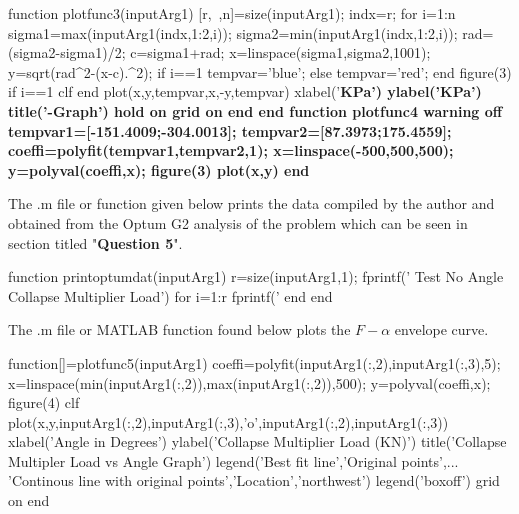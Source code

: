 \documentclass{article}
\begin{document}
\begin{matlabcode}
function plotfunc3(inputArg1)
[r,~,n]=size(inputArg1);
indx=r;
for i=1:n
    sigma1=max(inputArg1(indx,1:2,i));
    sigma2=min(inputArg1(indx,1:2,i));
    rad=(sigma2-sigma1)/2;
    c=sigma1+rad;
    x=linspace(sigma1,sigma2,1001);
    y=sqrt(rad^2-(x-c).^2);
    if i==1
        tempvar='blue';
    else
        tempvar='red';
    end
    figure(3)
    if i==1
        clf
    end
    plot(x,y,tempvar,x,-y,tempvar)
    xlabel('\bf\sigma KPa')
    ylabel('\bf\tau KPa')
    title('\tau-\sigma Graph')
    hold on
    grid on
end
end
function plotfunc4
warning off
tempvar1=[-151.4009;-304.0013];
tempvar2=[87.3973;175.4559];
coeffi=polyfit(tempvar1,tempvar2,1);
x=linspace(-500,500,500);
y=polyval(coeffi,x);
figure(3)
plot(x,y)
end
\end{matlabcode}

\begin{par}
\begin{flushleft}
The .m file or function given below prints the data compiled by the author and obtained from the Optum G2 analysis of the problem which can be seen in section titled "\textbf{Question 5}".
\end{flushleft}
\end{par}

\begin{matlabcode}
function printoptumdat(inputArg1)
r=size(inputArg1,1);
fprintf('       Test No                 Angle         Collapse Multiplier Load\n')
for i=1:r
    fprintf('%
end
end
\end{matlabcode}

\begin{par}
\begin{flushleft}
The .m file or MATLAB function found below plots the $F-\alpha$ envelope curve.
\end{flushleft}
\end{par}

\begin{matlabcode}
function[]=plotfunc5(inputArg1)
coeffi=polyfit(inputArg1(:,2),inputArg1(:,3),5);
x=linspace(min(inputArg1(:,2)),max(inputArg1(:,2)),500);
y=polyval(coeffi,x);
figure(4)
clf
plot(x,y,inputArg1(:,2),inputArg1(:,3),'o',inputArg1(:,2),inputArg1(:,3))
xlabel('Angle in Degrees')
ylabel('Collapse Multiplier Load (KN)')
title('Collapse Multipler Load vs Angle Graph')
legend('Best fit line','Original points',...
    'Continous line with original points','Location','northwest')
legend('boxoff')
grid on 
end
\end{matlabcode}
\end{document}
